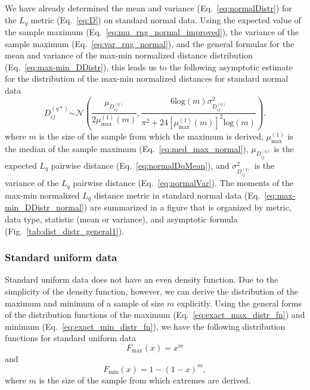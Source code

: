 \documentclass[10pt,letterpaper]{article}
\begin{document}
We have already determined the mean and variance (Eq.~\ref{eq:normalDistr}) for the $L_q$ metric (Eq.~\ref{eq:D}) on standard normal data. Using the expected value of the sample maximum (Eq.~\ref{eq:mu_rng_normal_improved}), the variance of the sample maximum (Eq.~\ref{eq:var_rng_normal}), and the general formulas for the mean and variance of the max-min normalized distance distribution (Eq.~\ref{eq:max-min_DDistr}), this leads us to the following asymptotic estimate for the distribution of the max-min normalized distances for standard normal data
%
\begin{equation}\label{eq:max-min_DDistr_normal}
D^{(q*)}_{ij} \overset{.}{\sim} \mathcal{N}\left(\frac{\mu_{D^{(q)}_{ij}}}{2\mu^{(1)}_\text{max}(m)}, \frac{6 \text{log}(m) \sigma^2_{D^{(q)}_{ij}}}{\pi^2 + 24 \left[\mu^{(1)}_\text{max}(m)\right]^2 \text{log}(m)}\right).
\end{equation}
%
where $m$ is the size of the sample from which the maximum is derived, $\mu^{(1)}_\text{max}$ is the median of the sample maximum (Eq.~\ref{eq:med_max_normal}), $\mu_{D^{(q)}_{ij}}$ is the expected $L_q$ pairwise distance (Eq.~\ref{eq:normalDqMean}), and $\sigma^2_{D^{(q)}_{ij}}$ is the variance of the $L_q$ pairwise distance (Eq.~\ref{eq:normalVar}). The moments of the max-min normalized $L_q$ distance metric in standard normal data (Eq.~\ref{eq:max-min_DDistr_normal}) are summarized in a figure that is organized by metric, data type, statistic (mean or variance), and asymptotic formula (Fig.~\ref{tab:dist_distr_general1}).

\subsubsection{Standard uniform data}

Standard uniform data does not have an even density function. Due to the simplicity of the density function, however, we can derive the distribution of the maximum and minimum of a sample of size $m$ explicitly. Using the general forms of the distribution functions of the maximum (Eq.~\ref{eq:exact_max_distr_fn}) and minimum (Eq.~\ref{eq:exact_min_distr_fn}), we have the following distribution functions for standard uniform data
%
\begin{equation}\label{eq:uniform_max_distr}
F_\text{max}(x) = x^m
\end{equation}
%
and
%
\begin{equation}\label{eq:uniform_min_distr}
F_\text{min}(x) = 1 - (1 - x)^m,
\end{equation}
%
where $m$ is the size of the sample from which extremes are derived.
\end{document}
